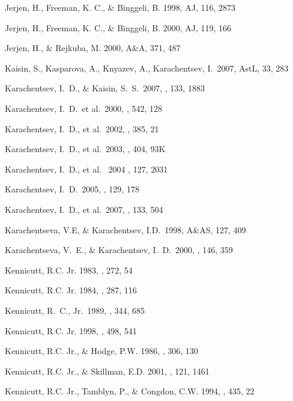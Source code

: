 \documentclass[12pt,preprint]{emulateapj}
\begin{document}
\begin{thebibliography}{}
Jerjen, H., Freeman, K. C., \& Binggeli, B. 1998, AJ, 116, 2873

Jerjen, H., Freeman, K. C., \& Binggeli, B. 2000, AJ, 119, 166 
 
Jerjen, H., \& Rejkuba, M. 2000, A\&A, 371, 487 

Kaisin, S., Kasparova, A., Knyazev, A., Karachentsev, I.\ 2007, AstL, 33, 283 

Karachentsev, I.~D., \& Kaisin, S.~S.\ 2007, \aj, 133, 1883 

Karachentsev, I.~D.~et al.\ 2000, \apj, 542, 128 

Karachentsev, I.~D., et al.\ 2002, \aap, 385, 21

Karachentsev, I.~D., et al.\ 2003, \aap, 404, 93K 

Karachentsev, I.~D., et al. \ 2004 \aj, 127, 2031

Karachentsev, I.~D.\ 2005, \aj, 129, 178 

Karachentsev, I.~D., et al.\ 2007, \aj, 133, 504 

Karachentseva, V.E, \& Karachentsev, I.D.\ 1998, A\&AS, 127, 409 

Karachentseva, V.~E., \& Karachentsev, I.~D.\ 2000, \aaps, 146, 359 

Kennicutt, R.C. Jr. 1983, \apj , 272, 54

Kennicutt, R.C. Jr. 1984, \apj , 287, 116

Kennicutt, R.~C., Jr.\ 1989, \apj, 344, 685 

Kennicutt, R.C. Jr. 1998, \apj , 498, 541

Kennicutt, R.C. Jr., \& Hodge, P.W. 1986, \apj , 306, 130

Kennicutt, R.C. Jr., \& Skillman, E.D. 2001, \aj , 121, 1461 

Kennicutt, R.C. Jr., Tamblyn, P., \& Congdon, C.W. 1994, \apj , 435, 22


\end{thebibliography}
\end{document}

